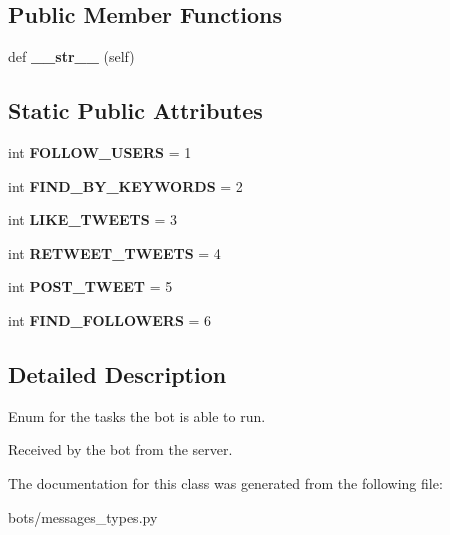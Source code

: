 \subsection*{Public Member Functions}
\begin{DoxyCompactItemize}
\item 
\mbox{\label{classtwitter_1_1bots_1_1messages__types_1_1ServerToBot_a985e5ee49b6d8aec3555283ca6bf2f28}} 
def {\bfseries \+\_\+\+\_\+str\+\_\+\+\_\+} (self)
\end{DoxyCompactItemize}
\subsection*{Static Public Attributes}
\begin{DoxyCompactItemize}
\item 
\mbox{\label{classtwitter_1_1bots_1_1messages__types_1_1ServerToBot_a88d7b857870002d072fe166c5470b57c}} 
int {\bfseries F\+O\+L\+L\+O\+W\+\_\+\+U\+S\+E\+RS} = 1
\item 
\mbox{\label{classtwitter_1_1bots_1_1messages__types_1_1ServerToBot_ab8ff4adb87b0a82e4a4d3a9d4872218f}} 
int {\bfseries F\+I\+N\+D\+\_\+\+B\+Y\+\_\+\+K\+E\+Y\+W\+O\+R\+DS} = 2
\item 
\mbox{\label{classtwitter_1_1bots_1_1messages__types_1_1ServerToBot_ae2b672776672a89efd18c364aa5863e6}} 
int {\bfseries L\+I\+K\+E\+\_\+\+T\+W\+E\+E\+TS} = 3
\item 
\mbox{\label{classtwitter_1_1bots_1_1messages__types_1_1ServerToBot_acc229477b6b55292309f5da7a305dfd0}} 
int {\bfseries R\+E\+T\+W\+E\+E\+T\+\_\+\+T\+W\+E\+E\+TS} = 4
\item 
\mbox{\label{classtwitter_1_1bots_1_1messages__types_1_1ServerToBot_a3b4fe80ad0c9c0ff7877174cab41fa97}} 
int {\bfseries P\+O\+S\+T\+\_\+\+T\+W\+E\+ET} = 5
\item 
\mbox{\label{classtwitter_1_1bots_1_1messages__types_1_1ServerToBot_ac1549a314813b403ecda2b7ead3c56c6}} 
int {\bfseries F\+I\+N\+D\+\_\+\+F\+O\+L\+L\+O\+W\+E\+RS} = 6
\end{DoxyCompactItemize}


\subsection{Detailed Description}
Enum for the tasks the bot is able to run. 

Received by the bot from the server. 

The documentation for this class was generated from the following file\+:\begin{DoxyCompactItemize}
\item 
bots/messages\+\_\+types.\+py\end{DoxyCompactItemize}
